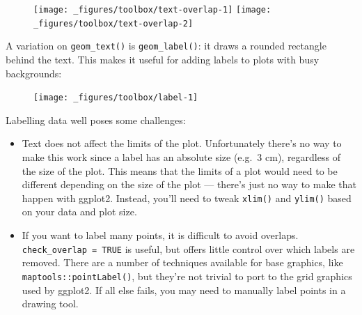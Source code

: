 \begin{itemize}
  \begin{figure}[H]
    \texttt{[image: \_figures/toolbox/text-overlap-1]}%
    \texttt{[image: \_figures/toolbox/text-overlap-2]}
  \end{figure}
\end{itemize}

A variation on \texttt{geom\_text()} is \texttt{geom\_label()}: it draws
a rounded rectangle behind the text. This makes it useful for adding
labels to plots with busy backgrounds: 

\begin{Shaded}
\begin{Highlighting}[]
\StringTok{ }\NormalTok{(}
   \NormalTok{(}\NormalTok{, }\NormalTok{), }
   \NormalTok{(}\NormalTok{, }\NormalTok{), }
   \NormalTok{(}\NormalTok{, }\NormalTok{)}
\NormalTok{)}

\StringTok{  }\NormalTok{(}\NormalTok{(} \StringTok{ }
\StringTok{  }\NormalTok{(} \NormalTok{(} 
\end{Highlighting}
\end{Shaded}

\begin{figure}[H]
  \centering
  \texttt{[image: \_figures/toolbox/label-1]}
\end{figure}

Labelling data well poses some challenges:

\begin{itemize}
\item
  Text does not affect the limits of the plot. Unfortunately there's no
  way to make this work since a label has an absolute size (e.g.~3 cm),
  regardless of the size of the plot. This means that the limits of a
  plot would need to be different depending on the size of the plot ---
  there's just no way to make that happen with ggplot2. Instead, you'll
  need to tweak \texttt{xlim()} and \texttt{ylim()} based on your data
  and plot size.
\item
  If you want to label many points, it is difficult to avoid overlaps.
  \texttt{check\_overlap\ =\ TRUE} is useful, but offers little control
  over which labels are removed. There are a number of techniques
  available for base graphics, like \texttt{maptools::pointLabel()}, but
  they're not trivial to port to the grid graphics used by ggplot2. If
  all else fails, you may need to manually label points in a drawing
  tool.
\end{itemize}

